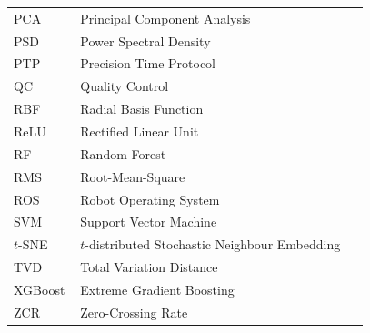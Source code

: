 \begin{longtable}{@{}p{0.18\linewidth} p{0.78\linewidth}@{}}
PCA         & Principal Component Analysis \\
PSD         & Power Spectral Density \\
PTP         & Precision Time Protocol \\
QC          & Quality Control \\
RBF         & Radial Basis Function \\
ReLU        & Rectified Linear Unit \\
RF          & Random Forest \\
RMS         & Root-Mean-Square \\
ROS         & Robot Operating System \\
SVM         & Support Vector Machine \\
$t$-SNE     & $t$-distributed Stochastic Neighbour Embedding \\
TVD         & Total Variation Distance \\
XGBoost     & Extreme Gradient Boosting \\
ZCR         & Zero-Crossing Rate \\
\bottomrule
\end{longtable}
